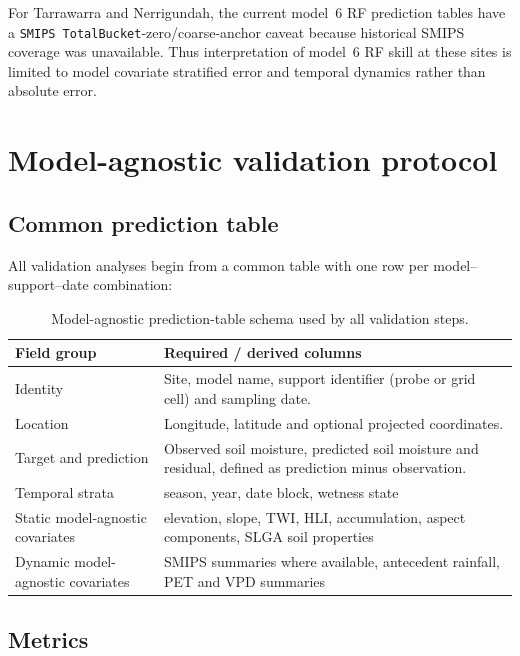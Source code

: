 \documentclass[11pt,a4paper]{article}
\newcommand{\modelSix}{model~6 RF}
\newcommand{\smips}{\texttt{SMIPS TotalBucket}}
\begin{document}
For Tarrawarra and Nerrigundah, the current \modelSix{} prediction
tables have a \smips{}-zero/coarse-anchor caveat because historical SMIPS
coverage was unavailable. Thus interpretation of \modelSix{} skill at these sites 
is limited to model covariate stratified error and temporal dynamics rather than
absolute error. 

\section{Model-agnostic validation protocol}\label{sec:protocol}

\subsection{Common prediction table}\label{sec:table-schema}

All validation analyses begin from a common table with one row per
model--support--date combination:

\begin{table}[htbp]
\centering
\small
\caption{Model-agnostic prediction-table schema used by all validation steps.}
\label{tab:prediction-schema}
\begin{tabularx}{\textwidth}{>{\raggedright\arraybackslash}p{3.2cm}
                              >{\raggedright\arraybackslash}X}
\toprule
Field group & Required / derived columns \\
\midrule
Identity & Site, model name, support identifier (probe or grid cell) and
sampling date. \\
Location & Longitude, latitude and optional projected coordinates. \\
Target and prediction & Observed soil moisture, predicted soil moisture and
residual, defined as prediction minus observation. \\
Temporal strata & season, year, date block, wetness state \\
Static model-agnostic covariates & elevation, slope, TWI, HLI, accumulation, aspect
components, SLGA soil properties \\
Dynamic model-agnostic covariates & SMIPS summaries where available, antecedent rainfall,
PET and VPD summaries \\
\bottomrule
\end{tabularx}
\end{table}

\subsection{Metrics}\label{sec:metrics}
\end{document}

